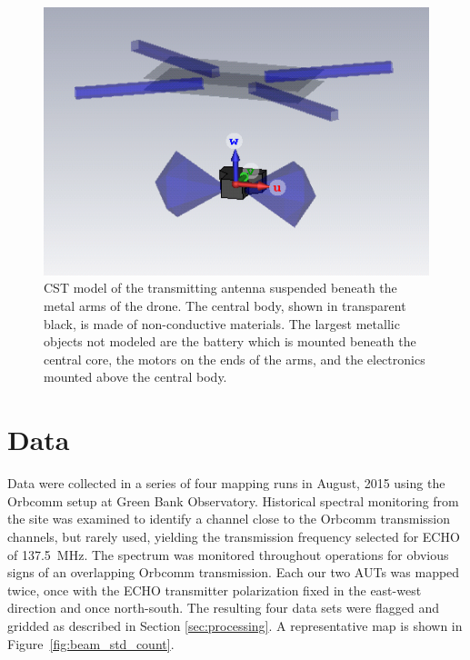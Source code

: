 \documentclass[preprint2,numberedappendix,tighten,twocolappendix]{aastex6}
\begin{document}
\begin{figure}
\includegraphics[width=\columnwidth]{figures/drone_antenna_screenshot.png}
\caption{CST model of the transmitting antenna suspended beneath the metal arms of the drone. The central body, shown in transparent black, is made of non-conductive materials. The largest metallic objects not modeled are the battery which is mounted beneath the central core, the motors on the ends of the arms, and the electronics mounted above the central body.}\label{fig:tx_cst}
\end{figure}




\section{Data}


Data were collected in a series of four mapping runs in August, 2015 using the Orbcomm setup at Green Bank Observatory.   Historical spectral monitoring from the site was examined to identify a channel close to the Orbcomm transmission channels, but rarely used, yielding the transmission frequency selected for ECHO of 137.5~MHz.  The spectrum was monitored throughout operations for obvious signs of an overlapping Orbcomm transmission.  Each our two AUTs was mapped twice, once with the ECHO transmitter polarization fixed in the east-west direction and once north-south.  The resulting four data sets were flagged and gridded as described in Section \ref{sec:processing}.  A representative map is shown in Figure~\ref{fig:beam_std_count}. 


\end{document}
